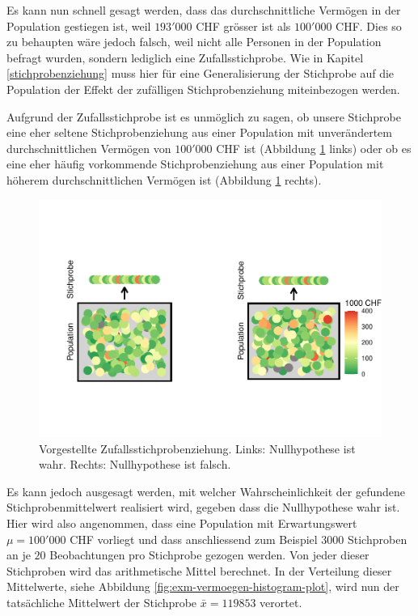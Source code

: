 \documentclass[
]{book}
\theoremstyle{definition}
\theoremstyle{definition}
\theoremstyle{definition}
\theoremstyle{definition}
\theoremstyle{remark}
\begin{document}
Es kann nun schnell gesagt werden, dass das durchschnittliche Vermögen in der Population gestiegen ist, weil \(193'000\) CHF grösser ist als \(100'000\) CHF. Dies so zu behaupten wäre jedoch falsch, weil nicht alle Personen in der Population befragt wurden, sondern lediglich eine Zufallsstichprobe. Wie in Kapitel \ref{stichprobenziehung} muss hier für eine Generalisierung der Stichprobe auf die Population der Effekt der zufälligen Stichprobenziehung miteinbezogen werden.

Aufgrund der Zufallsstichprobe ist es unmöglich zu sagen, ob unsere Stichprobe eine eher seltene Stichprobenziehung aus einer Population mit unverändertem durchschnittlichen Vermögen von \(100'000\) CHF ist (Abbildung \ref{fig:exm-vermoegen-sampling-plot} links) oder ob es eine eher häufig vorkommende Stichprobenziehung aus einer Population mit höherem durchschnittlichen Vermögen ist (Abbildung \ref{fig:exm-vermoegen-sampling-plot} rechts).

\begin{figure}
\centering
\includegraphics{aps_statistik1_files/figure-latex/exm-vermoegen-sampling-plot-1.pdf}
\caption{\label{fig:exm-vermoegen-sampling-plot}Vorgestellte Zufallsstichprobenziehung. Links: Nullhypothese ist wahr. Rechts: Nullhypothese ist falsch.}
\end{figure}

Es kann jedoch ausgesagt werden, mit welcher Wahrscheinlichkeit der gefundene Stichprobenmittelwert realisiert wird, gegeben dass die Nullhypothese wahr ist. Hier wird also angenommen, dass eine Population mit Erwartungswert \(\mu = 100'000\) CHF vorliegt und dass anschliessend zum Beispiel \(3000\) Stichproben an je \(20\) Beobachtungen pro Stichprobe gezogen werden. Von jeder dieser Stichproben wird das arithmetische Mittel berechnet. In der Verteilung dieser Mittelwerte, siehe Abbildung \ref{fig:exm-vermoegen-histogram-plot}, wird nun der tatsächliche Mittelwert der Stichprobe \(\bar{x} = 119853\) verortet.
\end{document}
